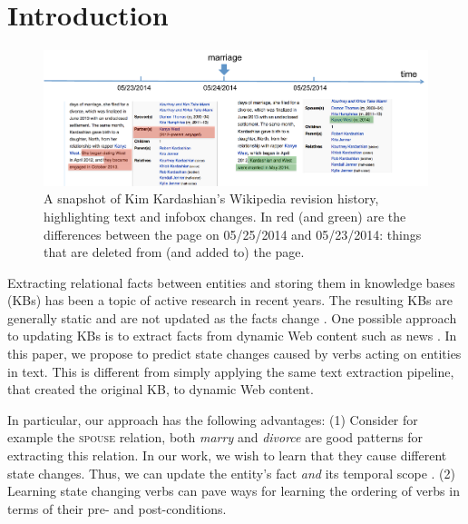 \section{Introduction}

\begin{figure}[t]
\begin{center}
\includegraphics[width=16cm,keepaspectratio=true]{figures/motivation.pdf}
\caption{\label{fig:motivation} A snapshot of Kim Kardashian's Wikipedia revision history, highlighting text and infobox changes. In red (and green) are the differences between the page on 05/25/2014 and 05/23/2014: things that are deleted from (and  added to) the page.}
\end{center}
\end{figure}

Extracting relational facts between entities and storing them in knowledge bases (KBs) has been a topic of active research in recent years. The resulting  KBs  are generally static  and are not updated as the facts change  \cite{suchanek2007yago,carlson2010toward,fader2011identifying,MitchellCHTBCMG15}. 
One possible approach to   updating KBs is to extract facts from dynamic Web content such as news \cite{nakashole2012real}. 
In this  paper, we propose to predict state changes caused by  verbs acting on entities in text. This is different from simply applying the same text extraction pipeline, that created the original KB, to dynamic Web content.

In particular,  our approach has the following advantages: (1) Consider for example the \textsc{spouse} relation, both \textit{marry} and \textit{divorce} are good patterns for extracting this relation. In our work, we wish to learn that they cause different state changes.
Thus,  we can update the entity's fact \textit{and} its temporal scope \cite{wijayactp}. (2) Learning state changing verbs
   can pave ways for learning the ordering of verbs in terms of their  pre- and post-conditions.
   
